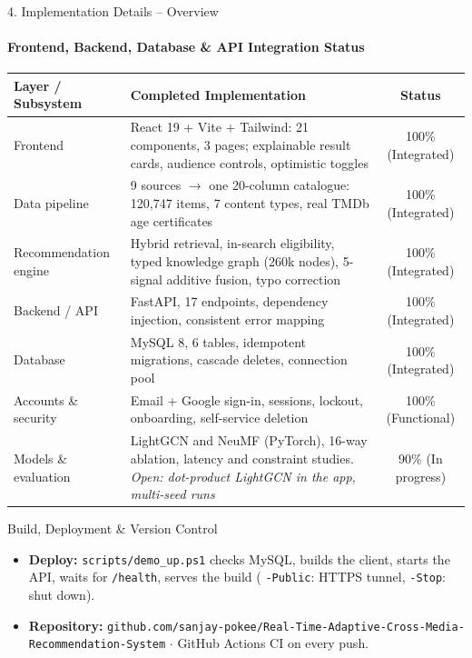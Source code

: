\documentclass[aspectratio=169, 11pt]{beamer}
\begin{document}
\begin{frame}{4. Implementation Details -- Overview}
    \framesubtitle{Frontend, Backend, Database \& API Integration Status}
    \tiny
    \renewcommand{\arraystretch}{1.22}
    \begin{tabular}{L{2.5cm} L{8.9cm} c}
        \toprule
        \textbf{Layer / Subsystem} & \textbf{Completed Implementation} & \textbf{Status} \\
        \midrule
        Frontend & React 19 + Vite + Tailwind: 21 components, 3 pages; explainable result cards, audience controls, optimistic toggles & 100\% (Integrated) \\
        Data pipeline & 9 sources $\rightarrow$ one 20-column catalogue: 120,747 items, 7 content types, real TMDb age certificates & 100\% (Integrated) \\
        Recommendation engine & Hybrid retrieval, in-search eligibility, typed knowledge graph (260k nodes), 5-signal additive fusion, typo correction & 100\% (Integrated) \\
        Backend / API & FastAPI, 17 endpoints, dependency injection, consistent error mapping & 100\% (Integrated) \\
        Database & MySQL 8, 6 tables, idempotent migrations, cascade deletes, connection pool & 100\% (Integrated) \\
        Accounts \& security & Email + Google sign-in, sessions, lockout, onboarding, self-service deletion & 100\% (Functional) \\
        Models \& evaluation & LightGCN and NeuMF (PyTorch), 16-way ablation, latency and constraint studies. \textit{Open: dot-product LightGCN in the app, multi-seed runs} & 90\% (In progress) \\
        \bottomrule
    \end{tabular}

    \vspace{0.2cm}
    \begin{block}{Build, Deployment \& Version Control}
        \scriptsize
        \begin{itemize}
            \item \textbf{Deploy:} \texttt{scripts/demo\_up.ps1} checks MySQL, builds the client, starts the API, waits for \texttt{/health}, serves the build ( \texttt{-Public}: HTTPS tunnel, \texttt{-Stop}: shut down).
            \item \textbf{Repository:} \texttt{github.com/sanjay-pokee/Real-Time-Adaptive-Cross-Media-Recommendation-System} $\cdot$ GitHub Actions CI on every push.
        \end{itemize}
    \end{block}
\end{frame}
\end{document}
